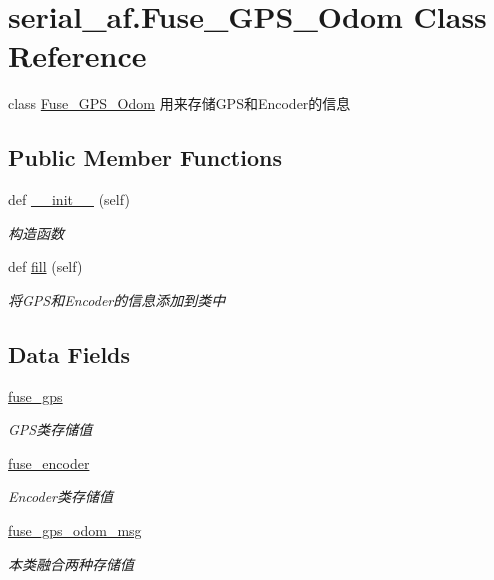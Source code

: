 \hypertarget{classserial__af_1_1_fuse___g_p_s___odom}{}\section{serial\+\_\+af.\+Fuse\+\_\+\+G\+P\+S\+\_\+\+Odom Class Reference}
\label{classserial__af_1_1_fuse___g_p_s___odom}


class \hyperlink{classserial__af_1_1_fuse___g_p_s___odom}{Fuse\+\_\+\+G\+P\+S\+\_\+\+Odom} 用来存储\+G\+P\+S和\+Encoder的信息  


\subsection*{Public Member Functions}
\begin{DoxyCompactItemize}
\item 
def \hyperlink{classserial__af_1_1_fuse___g_p_s___odom_a983aa897f4b787a1ed51ae30c7553ac0}{\+\_\+\+\_\+init\+\_\+\+\_\+} (self)
\begin{DoxyCompactList}\small\item\em 构造函数 \end{DoxyCompactList}\item 
def \hyperlink{classserial__af_1_1_fuse___g_p_s___odom_a52e5d244774440960542f69492fc636b}{fill} (self)
\begin{DoxyCompactList}\small\item\em 将\+G\+P\+S和\+Encoder的信息添加到类中 \end{DoxyCompactList}\end{DoxyCompactItemize}
\subsection*{Data Fields}
\begin{DoxyCompactItemize}
\item 
\hyperlink{classserial__af_1_1_fuse___g_p_s___odom_af6a96dc584c6f5f5511debb051b31f32}{fuse\+\_\+gps}
\begin{DoxyCompactList}\small\item\em G\+P\+S类存储值 \end{DoxyCompactList}\item 
\hyperlink{classserial__af_1_1_fuse___g_p_s___odom_a0dbf1186131460a6c32e29e25baf57f9}{fuse\+\_\+encoder}
\begin{DoxyCompactList}\small\item\em Encoder类存储值 \end{DoxyCompactList}\item 
\hyperlink{classserial__af_1_1_fuse___g_p_s___odom_a1fa064c6ed105a175d0b55b7cc999783}{fuse\+\_\+gps\+\_\+odom\+\_\+msg}
\begin{DoxyCompactList}\small\item\em 本类融合两种存储值 \end{DoxyCompactList}\end{DoxyCompactItemize}


